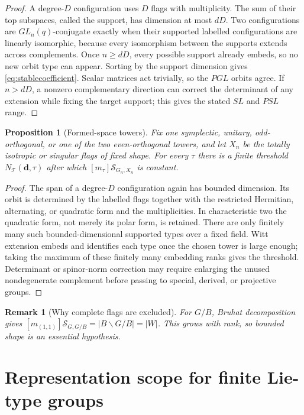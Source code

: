 \documentclass[11pt]{article}
\newtheorem{proposition}[theorem]{Proposition}
\newtheorem{remark}[theorem]{Remark}
\newcommand{\MGF}{\mathcal S}
\begin{document}
\begin{proof}
A degree-$D$ configuration uses $D$ flags with multiplicity.  The sum of their
top subspaces, called the support, has dimension at most $dD$.  Two
configurations are $GL_n(q)$-conjugate exactly when their supported labelled
configurations are linearly isomorphic, because every isomorphism between the
supports extends across complements.  Once $n\ge dD$, every possible support
already embeds, so no new orbit type can appear.  Sorting by the support
dimension gives \eqref{eq:stablecoefficient}.  Scalar matrices act trivially,
so the $PGL$ orbits agree.  If $n>dD$, a nonzero complementary direction can
correct the determinant of any extension while fixing the target support;
this gives the stated $SL$ and $PSL$ range.
\end{proof}

\begin{proposition}[Formed-space towers]\label{prop:formed}
Fix one symplectic, unitary, odd-orthogonal, or one of the two
even-orthogonal towers, and let $X_n$ be the totally isotropic or singular
flags of fixed shape.  For every $\tau$ there is a finite threshold
$N_{\mathcal T}(\mathbf d,\tau)$ after which
$[m_\tau]\MGF_{G_n,X_n}$ is constant.
\end{proposition}

\begin{proof}
The span of a degree-$D$ configuration again has bounded dimension.  Its orbit
is determined by the labelled flags together with the restricted Hermitian,
alternating, or quadratic form and the multiplicities.  In characteristic two
the quadratic form, not merely its polar form, is retained.  There are only
finitely many such bounded-dimensional supported types over a fixed field.
Witt extension embeds and identifies each type once the chosen tower is large
enough; taking the maximum of these finitely many embedding ranks gives the
threshold.  Determinant or spinor-norm correction may require enlarging the
unused nondegenerate complement before passing to special, derived, or
projective groups.
\end{proof}

\begin{remark}[Why complete flags are excluded]
For $G/B$, Bruhat decomposition gives
$[m_{(1,1)}]\MGF_{G,G/B}=|B\backslash G/B|=|W|$.  This grows with rank, so
bounded shape is an essential hypothesis.
\end{remark}

\section{Representation scope for finite Lie-type groups}
\end{document}
